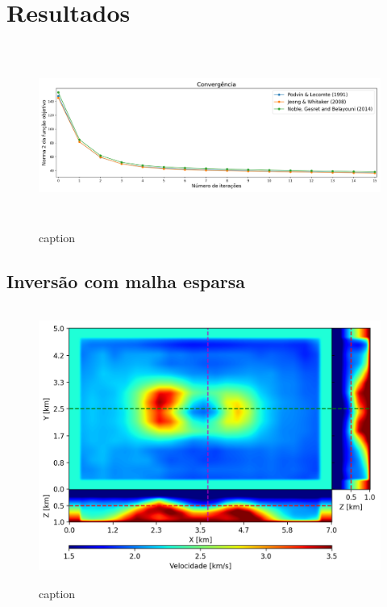 \chapter{Resultados}
\label{ch:resultados}


\begin{figure}[H]
	\centering
	\includegraphics[width=16cm,height=6cm]{Imgs/Resultados/convergencia.png}
	\caption{caption}
	\label{fig:}	
\end{figure}



\section{Inversão com malha esparsa}



\begin{figure}[H]
	\centering
	\includegraphics[width=12cm,height=9cm]{Imgs/Resultados/pod_sparse.png}
	\caption{caption}
	\label{fig:}	
\end{figure}


